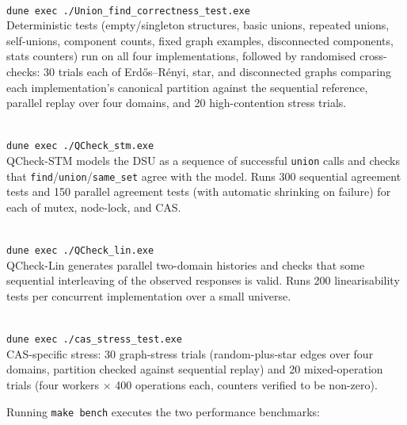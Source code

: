 \documentclass[11pt,a4paper]{article}
\begin{document}
\begin{description}[leftmargin=1.5em,labelindent=0em]
  \item[\texttt{make correctness}] ~\\
    \texttt{dune exec ./Union\_find\_correctness\_test.exe} \\
    Deterministic tests (empty/singleton structures, basic unions, repeated
    unions, self-unions, component counts, fixed graph examples, disconnected
    components, stats counters) run on all four implementations, followed by
    randomised cross-checks: 30 trials each of Erdős--Rényi, star, and
    disconnected graphs comparing each implementation's canonical partition
    against the sequential reference, parallel replay over four domains, and
    20 high-contention stress trials.

  \item[\texttt{make stm}] ~\\
    \texttt{dune exec ./QCheck\_stm.exe} \\
    QCheck-STM models the DSU as a sequence of successful \texttt{union} calls
    and checks that \texttt{find}/\texttt{union}/\texttt{same\_set} agree with
    the model.  Runs 300 sequential agreement tests and 150 parallel agreement
    tests (with automatic shrinking on failure) for each of mutex, node-lock,
    and CAS.

  \item[\texttt{make lin}] ~\\
    \texttt{dune exec ./QCheck\_lin.exe} \\
    QCheck-Lin generates parallel two-domain histories and checks that some
    sequential interleaving of the observed responses is valid.  Runs 200
    linearisability tests per concurrent implementation over a small universe.

  \item[\texttt{make cas-stress}] ~\\
    \texttt{dune exec ./cas\_stress\_test.exe} \\
    CAS-specific stress: 30 graph-stress trials (random-plus-star edges over
    four domains, partition checked against sequential replay) and 20
    mixed-operation trials (four workers $\times$ 400 operations each,
    counters verified to be non-zero).
\end{description}

Running \texttt{make bench} executes the two performance benchmarks:
\end{document}
